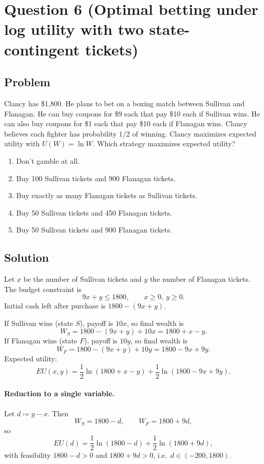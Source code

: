 \documentclass[12pt]{article}
\begin{document}
\section*{Question 6 (Optimal betting under log utility with two state-contingent tickets)}
\subsection*{Problem}
Clancy has \$1{,}800. He plans to bet on a boxing match between Sullivan and Flanagan.
He can buy coupons for \$9 each that pay \$10 each if Sullivan wins.
He can also buy coupons for \$1 each that pay \$10 each if Flanagan wins.
Clancy believes each fighter has probability \(1/2\) of winning.
Clancy maximizes expected utility with \(U(W)=\ln W\).
Which strategy maximizes expected utility?
\begin{enumerate}[label=(\alph*), leftmargin=*]
\item Don't gamble at all.
\item Buy 100 Sullivan tickets and 900 Flanagan tickets.
\item Buy exactly as many Flanagan tickets as Sullivan tickets.
\item Buy 50 Sullivan tickets and 450 Flanagan tickets.
\item Buy 50 Sullivan tickets and 900 Flanagan tickets.
\end{enumerate}

\subsection*{Solution}
Let \(x\) be the number of Sullivan tickets and \(y\) the number of Flanagan tickets. The budget constraint is
\[
9x+y \le 1800,\qquad x\ge 0,\ y\ge 0.
\]
Initial cash left after purchase is \(1800-(9x+y)\).

If Sullivan wins (state \(S\)), payoff is \(10x\), so final wealth is
\[
W_S = 1800-(9x+y)+10x = 1800 + x - y.
\]
If Flanagan wins (state \(F\)), payoff is \(10y\), so final wealth is
\[
W_F = 1800-(9x+y)+10y = 1800 - 9x + 9y.
\]
Expected utility:
\[
EU(x,y)=\frac12\ln(1800+x-y)+\frac12\ln(1800-9x+9y).
\]

\paragraph{Reduction to a single variable.}
Let \(d\coloneqq y-x\). Then
\[
W_S = 1800-d,\qquad W_F = 1800+9d,
\]
so
\[
EU(d)=\frac12\ln(1800-d)+\frac12\ln(1800+9d),
\]
with feasibility \(1800-d>0\) and \(1800+9d>0\), i.e.\ \(d\in(-200,1800)\).
\end{document}
